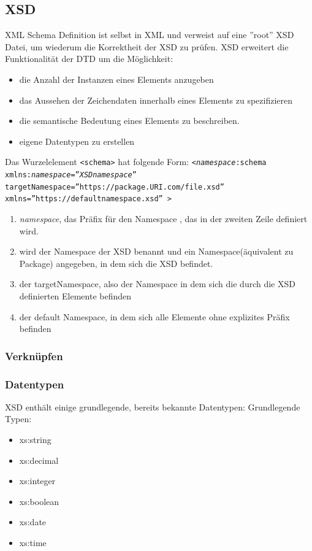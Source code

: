 \documentclass[12pt,a4]{article}
\begin{document}
\subsection{XSD}%
XML Schema Definition ist selbst in XML und verweist auf eine ''root'' XSD Datei, um wiederum die Korrektheit der XSD zu prüfen. XSD erweitert die Funktionalität der DTD um die Möglichkeit:
\begin{itemize}
	\item die Anzahl der Instanzen eines Elements anzugeben
	\item das Aussehen der Zeichendaten innerhalb eines Elements zu spezifizieren
	\item die semantische Bedeutung eines Elements zu beschreiben.
	\item eigene Datentypen zu erstellen
\end{itemize}
Das Wurzelelement \texttt{<schema>} hat folgende Form:\newline
\texttt{<\textit{namespace}:schema \newline xmlns:\textit{namespace}=''\textit{XSDnamespace}'' \newline
	targetNamespace=''https://package.URI.com/file.xsd'' \newline
	xmlns=''https://defaultnamespace.xsd'' >}
\begin{enumerate}
	\item \textit{namespace}, das Präfix für den Namespace , das in der zweiten Zeile definiert wird.
	\item wird der Namespace der XSD benannt und ein Namespace(äquivalent zu Package) angegeben, in dem sich die XSD befindet.
	\item der targetNamespace, also der Namespace in dem sich die durch die XSD definierten Elemente befinden
	\item der default Namespace, in dem sich alle Elemente ohne explizites Präfix befinden
\end{enumerate}
\subsubsection{Verknüpfen}

\subsubsection{Datentypen}
XSD enthält einige grundlegende, bereits bekannte Datentypen:
Grundlegende Typen:
\begin{multicols}{3}
	\begin{itemize}
		\item xs:string
		\item xs:decimal
		\item xs:integer
		\item xs:boolean
		\item xs:date
		\item xs:time
	\end{itemize}
\end{multicols}
\end{document}
